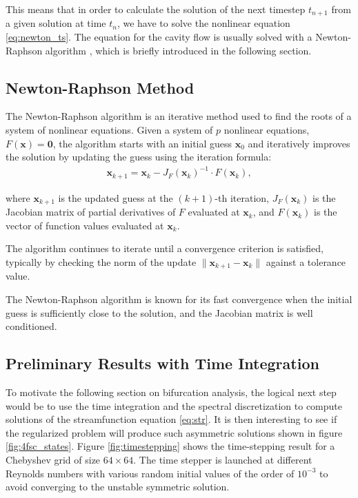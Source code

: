 This means that in order to calculate the solution of the next timestep
$t_{n+1}$ from a given solution at time $t_n$, we have to solve the nonlinear
equation \eqref{eq:newton_ts}. The equation for the cavity flow is usually
solved with a Newton-Raphson algorithm \citep{kuhlmann2019}, which is briefly
introduced in the following section. 

\subsection{Newton-Raphson Method}

The Newton-Raphson algorithm is an iterative method used to find the roots of a
system of nonlinear equations. Given a system of $p$ nonlinear equations,
$F(\mathbf{x}) = \mathbf{0}$, the algorithm starts with an initial guess
$\mathbf{x}_0$ and iteratively improves the solution by updating the guess
using the iteration formula:
\begin{align} 
\mathbf{x}_{k+1} = \mathbf{x}_k - J_F(\mathbf{x}_k)^{-1} \cdot F(\mathbf{x}_k),
\end{align}

where $\mathbf{x}_{k+1}$ is the updated guess at the $(k+1)$-th iteration,
$J_F(\mathbf{x}_k)$ is the Jacobian matrix of partial derivatives of $F$
evaluated at $\mathbf{x}_k$, and $F(\mathbf{x}_k)$ is the vector of function
values evaluated at $\mathbf{x}_k$.

The algorithm continues to iterate until a convergence criterion is satisfied,
typically by checking the norm of the update $\|\mathbf{x}_{k+1} -
\mathbf{x}_k\|$ against a tolerance value.

The Newton-Raphson algorithm is known for its fast convergence when the initial
guess is sufficiently close to the solution, and the Jacobian matrix is well
conditioned.

\subsection{Preliminary Results with Time Integration}

To motivate the following section on bifurcation analysis, the logical next
step would be to use the time integration and the spectral discretization to
compute solutions of the streamfunction equation \eqref{eq:str}. It is then
interesting to see if the regularized problem will produce such asymmetric
solutions shown in figure \ref{fig:4fsc_states}. Figure \ref{fig:timestepping}
shows the time-stepping result for a Chebyshev grid of size $64 \times 64$. The
time stepper is launched at different Reynolds numbers with various random
initial values of the order of $10^{-3}$ to avoid converging to the unstable
symmetric solution.

